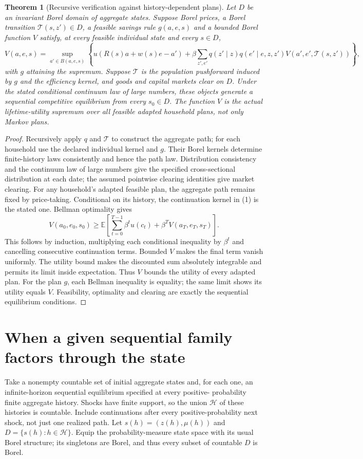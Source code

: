 \documentclass[11pt]{article}
\newtheorem{theorem}{Theorem}
\theoremstyle{remark}
\newcommand{\E}{\mathbb E}
\begin{document}
\begin{theorem}[Recursive verification against history-dependent plans]
Let $D$ be an invariant Borel domain of aggregate states. Suppose Borel
prices, a Borel transition $\mathcal T(s,z')\in D$, a feasible savings
rule $g(a,e,s)$ and a bounded Borel function $V$ satisfy, at every feasible
individual state and every $s\in D$,
\[
 V(a,e,s)=\sup_{a'\in B(a,e,s)}
 \left\{u(R(s)a+w(s)e-a')+
 \beta\sum_{z',e'}q(z'\mid z)q(e'\mid e,z,z')
 V(a',e',\mathcal T(s,z'))\right\}, \tag{1}
\]
with $g$ attaining the supremum. Suppose $\mathcal T$ is the population
pushforward induced by $g$ and the efficiency kernel, and goods and
capital markets clear on $D$. Under the stated conditional continuum
law of large numbers, these objects generate a sequential competitive
equilibrium from every $s_0\in D$. The function $V$ is the actual
lifetime-utility supremum over all feasible adapted household plans,
not only Markov plans.
\end{theorem}
\begin{proof}
Recursively apply $q$ and $\mathcal T$ to construct the aggregate path;
for each household use the declared individual kernel and $g$. Their
Borel kernels determine finite-history laws consistently and hence the
path law. Distribution consistency and the continuum law of large
numbers give the specified cross-sectional distribution at each date;
the assumed pointwise clearing identities give market clearing.
For any household's adapted feasible plan, the aggregate path remains
fixed by price-taking. Conditional on its history, the continuation
kernel in (1) is the stated one. Bellman optimality gives
\[
 V(a_0,e_0,s_0)\geq
 \E\left[\sum_{t=0}^{T-1}\beta^t u(c_t)
                   +\beta^T V(a_T,e_T,s_T)\right].
\]
This follows by induction, multiplying each conditional inequality by
$\beta^t$ and cancelling consecutive continuation terms. Bounded $V$
makes the final term vanish uniformly. The utility bound makes the
discounted sum absolutely integrable and permits its limit inside
expectation. Thus $V$ bounds the utility of every adapted plan. For the
plan $g$, each Bellman inequality is equality; the same limit shows
its utility equals $V$. Feasibility, optimality and clearing are exactly
the sequential equilibrium conditions.
\end{proof}

\section{When a given sequential family factors through the state}
Take a nonempty countable set of initial aggregate states and, for each one, an
infinite-horizon sequential equilibrium specified at every positive-
probability finite aggregate history. Shocks have finite support, so the
union $\mathcal H$ of these histories is countable. Include continuations
after every positive-probability next shock, not just one realized path.
Let $s(h)=(z(h),\mu(h))$ and $D=\{s(h):h\in\mathcal H\}$.
Equip the probability-measure state space with its usual Borel structure;
its singletons are Borel, and thus every subset of countable $D$ is Borel.
\end{document}
